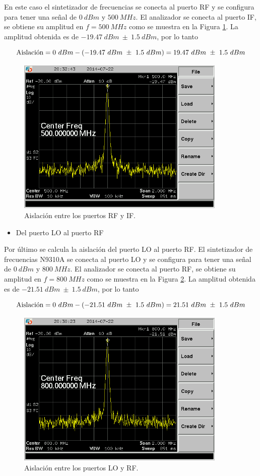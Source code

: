 \documentclass[a4paper,10pt]{article}
\begin{document}
	\indent En este caso el sintetizador de frecuencias se conecta al puerto RF 
	y se configura para tener una se\~nal de $0~dBm$ y $500~MHz$. El analizador 
	se conecta al puerto IF, se obtiene su amplitud en $f=500~MHz$ como se 
	muestra en la Figura \ref{isolation2fran}. La amplitud obtenida es de 
	$-19.47~dBm~\pm~1.5~dBm$, por lo tanto
		
	$$\textmd{Aislaci\'on}=0~dBm-(-19.47~dBm~\pm~1.5~dBm)=19.47~dBm~\pm~1.5~dBm$$
	
	\begin{figure}[!htb]
		\centering
		\includegraphics[width=10cm]{Images/SCREN534.png}
		\caption{Aislaci\'on entre los puertos RF y IF.}
		\label{isolation2fran}
	\end{figure}
	
	\begin{itemize}
		\item Del puerto LO al puerto RF
	\end{itemize}
	
	\indent Por \'ultimo se calcula la aislaci\'on del puerto LO al puerto RF. 
	El sintetizador de frecuencias N9310A se conecta al puerto LO y se configura
	para tener una se\~nal de $0~dBm$ y $800~MHz$. El analizador se conecta al 
	puerto RF, se obtiene su amplitud en $f=800~MHz$ como se muestra en la 
	Figura \ref{isolation3fran}. La amplitud obtenida es de 
	$-21.51~dBm~\pm~1.5~dBm$, por lo tanto
			
	$$\textmd{Aislaci\'on}=0~dBm-(-21.51~dBm~\pm~1.5~dBm)=21.51~dBm~\pm~1.5~dBm$$
	
	\begin{figure}[!htb]
		\centering
		\includegraphics[width=10cm]{Images/SCREN533.png}
		\caption{Aislaci\'on entre los puertos LO y RF.}
		\label{isolation3fran}
	\end{figure}	
	
\end{document}
